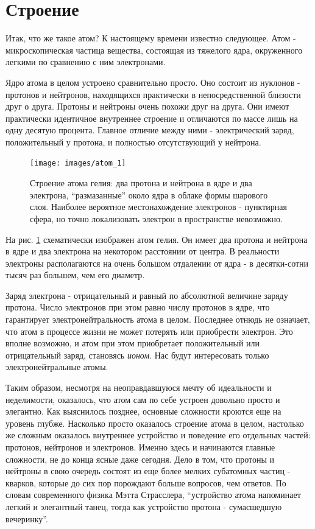 \section*{Строение}

Итак, что же такое атом? К настоящему времени известно следующее.
Атом - микроскопическая частица вещества, состоящая из тяжелого ядра, окруженного легкими по сравнению с ним электронами.

Ядро атома в целом устроено сравнительно просто.
Оно состоит из нуклонов - протонов и нейтронов, находящихся практически в непосредственной близости друг о друга.
Протоны и нейтроны очень похожи друг на друга.
Они имеют практически идентичное внутреннее строение и отличаются по массе лишь на одну десятую процента.
Главное отличие между ними - электрический заряд, положительный у протона, и полностью отсутствующий у нейтрона.

\begin{figure}[t!]
   \centering
   \texttt{[image: images/atom\_1]}
   \caption{Строение атома гелия: два протона и нейтрона в ядре и два электрона, ``размазанные'' около ядра в облаке формы шарового слоя. Наиболее вероятное местонахождение электронов - пунктирная сфера, но точно локализовать электрон в пространстве невозможно.}
   \label{fig:atom_1}
\end{figure}

На рис. \ref{fig:atom_1} схематически изображен атом гелия.
Он имеет два протона и нейтрона в ядре и два электрона на некотором расстоянии от центра.
В реальности электроны располагаются на очень большом отдалении от ядра - в десятки-сотни тысяч раз большем, чем его диаметр.

Заряд электрона - отрицательный и равный по абсолютной величине заряду протона.
Число электронов при этом равно числу протонов в ядре, что гарантирует электронейтральность атома в целом.
Последнее отнюдь не означает, что атом в процессе жизни не может потерять или приобрести электрон.
Это вполне возможно, и атом при этом приобретает положительный или отрицательный заряд, становясь \textit{ионом}.
Нас будут интересовать только электронейтральные атомы.

Таким образом, несмотря на неоправдавшуюся мечту об идеальности и неделимости, оказалось, что атом сам по себе устроен довольно просто и элегантно.
Как выяснилось позднее, основные сложности кроются еще на уровень глубже.
Насколько просто оказалось строение атома в целом, настолько же сложным оказалось внутреннее устройство и поведение его отдельных частей: протонов, нейтронов и электронов.
Именно здесь и начинаются главные сложности, не до конца ясные даже сегодня.
Дело в том, что протоны и нейтроны в свою очередь состоят из еще более мелких субатомных частиц - кварков, которые до сих пор порождают больше вопросов, чем ответов.
По словам современного физика Мэтта Страсслера, ``устройство атома напоминает легкий и элегантный танец, тогда как устройство протона - сумасшедшую вечеринку''.

